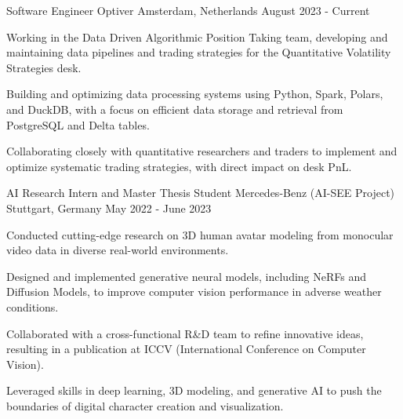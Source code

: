 
\begin{cventries}

  \cventry
    {Software Engineer} %
    {Optiver} %
    {Amsterdam, Netherlands} %
    {August 2023 - Current} %
    {
      \begin{cvitems} %
        \item {Working in the Data Driven Algorithmic Position Taking team, developing and maintaining data pipelines and trading strategies for the Quantitative Volatility Strategies desk.}
        \item {Building and optimizing data processing systems using Python, Spark, Polars, and DuckDB, with a focus on efficient data storage and retrieval from PostgreSQL and Delta tables.}
        \item {Collaborating closely with quantitative researchers and traders to implement and optimize systematic trading strategies, with direct impact on desk PnL.}
      \end{cvitems}
    }

  \cventry
    {AI Research Intern and Master Thesis Student} %
    {Mercedes-Benz (AI-SEE Project)} %
    {Stuttgart, Germany} %
    {May 2022 - June 2023} %
    {
      \begin{cvitems} %
        \item {Conducted cutting-edge research on 3D human avatar modeling from monocular video data in diverse real-world environments.}
        \item {Designed and implemented generative neural models, including NeRFs and Diffusion Models, to improve computer vision performance in adverse weather conditions.}
        \item {Collaborated with a cross-functional R\&D team to refine innovative ideas, resulting in a publication at ICCV (International Conference on Computer Vision).}
        \item {Leveraged skills in deep learning, 3D modeling, and generative AI to push the boundaries of digital character creation and visualization.}
      \end{cvitems}
    }

\end{cventries}
